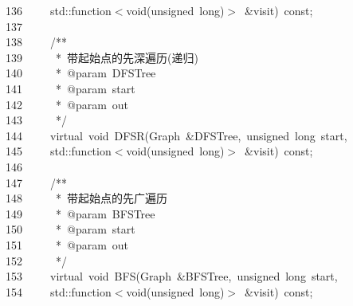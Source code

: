 \documentclass{ctexart}
\newcommand{\hlstd}[1]{\textcolor[rgb]{0.2,0.2,0.2}{#1}}
\newcommand{\hlcom}[1]{\textcolor[rgb]{0.59,0.59,0.59}{#1}}
\newcommand{\hlopt}[1]{\textcolor[rgb]{0.2,0.2,0.2}{#1}}
\newcommand{\hllin}[1]{\textcolor[rgb]{0.59,0.59,0.59}{#1}}
\newcommand{\hlkwb}[1]{\textcolor[rgb]{0.63,0,0.31}{#1}}
\newcommand{\hlkwc}[1]{\textcolor[rgb]{0,0.63,0.31}{#1}}
\newcommand{\hlkwd}[1]{\textcolor[rgb]{0.78,0.23,0.41}{#1}}
\begin{document}
\hllin{136\ }\hlstd{}\hlstd{\ \ \ \ }\hlstd{}\hlkwc{std}\hlstd{}\hlopt{::}\hlstd{function}\hlopt{$<$}\hlstd{}\hlkwb{void}\hlstd{}\hlopt{(}\hlstd{}\hlkwb{unsigned\ long}\hlstd{}\hlopt{)$>$\ \&}\hlstd{visit}\hlopt{)\ }\hlstd{}\hlkwb{const}\hlstd{}\hlopt{;}\\
\hllin{137\ }\hlstd{}\\
\hllin{138\ }\hlstd{}\hlstd{\ \ \ \ }\hlstd{}\hlcom{/{*}{*}}\\
\hllin{139\ }\hlcom{}\hlstd{\ \ \ \ \ }\hlcom{{*}\ 带起始点的先深遍历(递归)}\\
\hllin{140\ }\hlcom{}\hlstd{\ \ \ \ \ }\hlcom{{*}\ @param\ DFSTree}\\
\hllin{141\ }\hlcom{}\hlstd{\ \ \ \ \ }\hlcom{{*}\ @param\ start}\\
\hllin{142\ }\hlcom{}\hlstd{\ \ \ \ \ }\hlcom{{*}\ @param\ out}\\
\hllin{143\ }\hlcom{}\hlstd{\ \ \ \ \ }\hlcom{{*}/}\hlstd{}\\
\hllin{144\ }\hlstd{}\hlstd{\ \ \ \ }\hlstd{}\hlkwc{virtual\ }\hlstd{}\hlkwb{void\ }\hlstd{}\hlkwd{DFSR}\hlstd{}\hlopt{(}\hlstd{Graph\ }\hlopt{\&}\hlstd{DFSTree}\hlopt{,\ }\hlstd{}\hlkwb{unsigned\ long\ }\hlstd{start}\hlopt{,\ }\Righttorque\\
\hllin{145\ }\hlstd{}\hlstd{\ \ \ \ }\hlstd{}\hlkwc{std}\hlstd{}\hlopt{::}\hlstd{function}\hlopt{$<$}\hlstd{}\hlkwb{void}\hlstd{}\hlopt{(}\hlstd{}\hlkwb{unsigned\ long}\hlstd{}\hlopt{)$>$\ \&}\hlstd{visit}\hlopt{)\ }\hlstd{}\hlkwb{const}\hlstd{}\hlopt{;}\\
\hllin{146\ }\hlstd{}\\
\hllin{147\ }\hlstd{}\hlstd{\ \ \ \ }\hlstd{}\hlcom{/{*}{*}}\\
\hllin{148\ }\hlcom{}\hlstd{\ \ \ \ \ }\hlcom{{*}\ 带起始点的先广遍历}\\
\hllin{149\ }\hlcom{}\hlstd{\ \ \ \ \ }\hlcom{{*}\ @param\ BFSTree}\\
\hllin{150\ }\hlcom{}\hlstd{\ \ \ \ \ }\hlcom{{*}\ @param\ start}\\
\hllin{151\ }\hlcom{}\hlstd{\ \ \ \ \ }\hlcom{{*}\ @param\ out}\\
\hllin{152\ }\hlcom{}\hlstd{\ \ \ \ \ }\hlcom{{*}/}\hlstd{}\\
\hllin{153\ }\hlstd{}\hlstd{\ \ \ \ }\hlstd{}\hlkwc{virtual\ }\hlstd{}\hlkwb{void\ }\hlstd{}\hlkwd{BFS}\hlstd{}\hlopt{(}\hlstd{Graph\ }\hlopt{\&}\hlstd{BFSTree}\hlopt{,\ }\hlstd{}\hlkwb{unsigned\ long\ }\hlstd{start}\hlopt{,\ }\Righttorque\\
\hllin{154\ }\hlstd{}\hlstd{\ \ \ \ }\hlstd{}\hlkwc{std}\hlstd{}\hlopt{::}\hlstd{function}\hlopt{$<$}\hlstd{}\hlkwb{void}\hlstd{}\hlopt{(}\hlstd{}\hlkwb{unsigned\ long}\hlstd{}\hlopt{)$>$\ \&}\hlstd{visit}\hlopt{)\ }\hlstd{}\hlkwb{const}\hlstd{}\hlopt{;}\\
\end{document}
